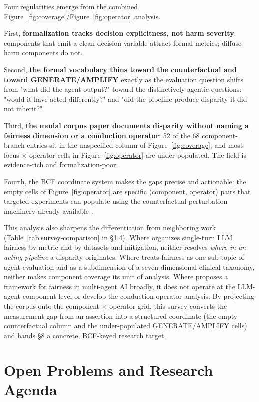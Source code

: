 \documentclass[acmsmall,nonacm]{acmart}
\begin{document}
Four regularities emerge from the combined Figure~\ref{fig:coverage}/Figure~\ref{fig:operator} analysis.

First, \textbf{formalization tracks decision explicitness, not harm severity}: components that emit a clean decision variable attract formal metrics; diffuse-harm components do not.

Second, \textbf{the formal vocabulary thins toward the counterfactual and toward GENERATE/AMPLIFY} exactly as the evaluation question shifts from "what did the agent output?" toward the distinctively agentic questions: "would it have acted differently?" and "did the pipeline produce disparity it did not inherit?"

Third, \textbf{the modal corpus paper documents disparity without naming a fairness dimension or a conduction operator}: 52 of the 68 component-branch entries sit in the unspecified column of Figure~\ref{fig:coverage}, and most locus $\times$ operator cells in Figure~\ref{fig:operator} are under-populated. The field is evidence-rich and formalization-poor.

Fourth, the BCF coordinate system makes the gaps precise and actionable: the empty cells of Figure~\ref{fig:operator} are specific (component, operator) pairs that targeted experiments can populate using the counterfactual-perturbation machinery already available \cite{parziale2025systematic,mayilvaghanan2026counterfactual,basu2026names}.

This analysis also sharpens the differentiation from neighboring work (Table~\ref{tab:survey-comparison} in \S{}1.4). Where \cite{chu2024fairness} organizes single-turn LLM fairness by metric and \cite{gallegos2024bias} by datasets and mitigation, neither resolves \emph{where in an acting pipeline} a disparity originates. Where \cite{mohammadi2025evaluation} treats fairness as one sub-topic of agent evaluation and \cite{vatsal2026agentic} as a subdimension of a seven-dimensional clinical taxonomy, neither makes component coverage its unit of analysis. Where \cite{ranjan2025fairness} proposes a framework for fairness in multi-agent AI broadly, it does not operate at the LLM-agent component level or develop the conduction-operator analysis. By projecting the corpus onto the component $\times$ operator grid, this survey converts the measurement gap from an assertion into a structured coordinate (the empty counterfactual column and the under-populated GENERATE/AMPLIFY cells) and hands \S{}8 a concrete, BCF-keyed research target.

\section{Open Problems and Research Agenda}
\end{document}
